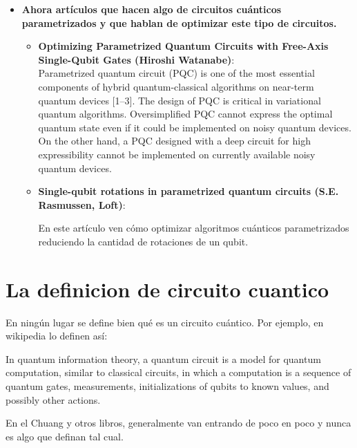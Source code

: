 \documentclass[10pt,letterpaper]{article} %
\begin{document}
\begin{itemize}
\item \textbf{Ahora art\'iculos que hacen algo de circuitos cu\'anticos parametrizados y que hablan de optimizar este tipo de circuitos.}


\begin{itemize}
\item  \textbf{Optimizing Parametrized Quantum Circuits
with Free-Axis Single-Qubit Gates (Hiroshi Watanabe)}:\\

Parametrized quantum circuit (PQC) is one of the most essential components of hybrid quantum-classical
algorithms on near-term quantum devices [1–3]. 
The design of PQC is critical in variational quantum algorithms. Oversimplified PQC cannot express
the optimal quantum state even if it could be implemented on noisy quantum devices. On the other
hand, a PQC designed with a deep circuit for high expressibility cannot be implemented on currently available noisy quantum devices.\\

\item  \textbf{Single-qubit rotations in parametrized quantum circuits (S.E. Rasmussen, Loft)}:

En este art\'iculo ven c\'omo optimizar algoritmos cu\'anticos parametrizados reduciendo la cantidad de rotaciones de un qubit.

\end{itemize}







\end{itemize}



\newpage
\section{La definicion de circuito cuantico}

En ningún lugar se define bien qué es un circuito cuántico. Por ejemplo, en wikipedia lo definen así:

In quantum information theory, a quantum circuit is a model for quantum computation, similar to classical circuits, in which a computation is a sequence of quantum gates, measurements, initializations of qubits to known values, and possibly other actions. 

En el Chuang y otros libros, generalmente van entrando de poco en poco y nunca es algo que definan tal cual.
\end{document}
